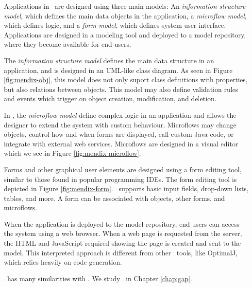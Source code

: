 Applications in \mendix~are designed using three main models: An \textit{information structure model}, which defines the main data objects in the application, a \textit{microflow model}, which defines logic, and a \textit{form model}, which defines system user interface. Applications are designed in a modeling tool and deployed to a model repository, where they become available for end users.

The \textit{information structure model} defines the main data structure in an application, and is designed in an UML-like class diagram. As seen in Figure \ref{fig:mendix-obj}, this model does not only suport class definitions with properties, but also relations between objects. This model may also define validation rules and events which trigger on object creation, modification, and deletion.

In \mendix, the \textit{microflow model} define complex logic in an application and allows the designer to extend the system with custom behaviour. Microflows may change objects, control how and when forms are displayed, call custom Java code, or integrate with external web services. Microflows are designed in a visual editor which we see in Figure \ref{fig:mendix-microflow}. 

Forms and other graphical user elements are designed using a form editing tool, similar to those found in popular programming IDEs. The form editing tool is depicted in Figure \ref{fig:mendix-form}. \mendix~supports basic input fields, drop-down lists, tables, and more. A form can be associated with objects, other forms, and microflows. 

When the application is deployed to the model repository, end users can access the system using a web browser. When a web page is requested from the server, the HTML and JavaScript required showing the page is created and sent to the model. This interpreted approach is different from other \mde~tools, like OptimalJ, which relies heavily on code generation. 

\gap~has many similarities with \mendix. We study \gap~in Chapter \ref{chap:gap}.

